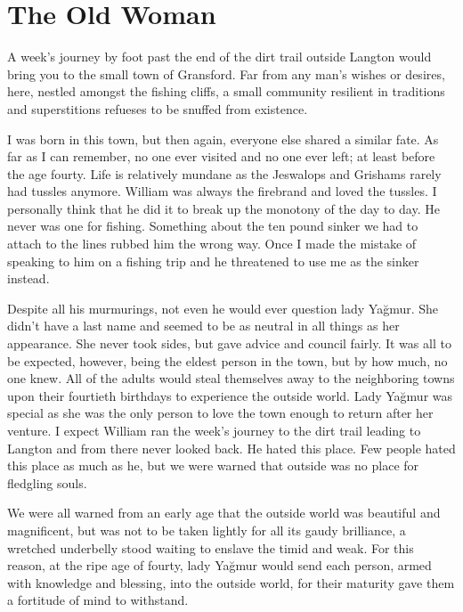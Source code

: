 \chapter*{The Old Woman}


A week's journey by foot past the end of the dirt trail outside Langton would bring you to the small town of Gransford. Far from any man's wishes or desires, here, nestled amongst the fishing cliffs, a small community resilient in traditions and superstitions refueses to be snuffed from existence.

I was born in this town, but then again, everyone else shared a similar fate. As far as I can remember, no one ever visited and no one ever left; at least before the age fourty. Life is relatively mundane as the Jeswalops and Grishams rarely had tussles anymore. William was always the firebrand and loved the tussles. I personally think that he did it to break up the monotony of the day to day. He never was one for fishing. Something about the ten pound sinker we had to attach to the lines rubbed him the wrong way. Once I made the mistake of speaking to him on a fishing trip and he threatened to use me as the sinker instead.

Despite all his murmurings, not even he would ever question lady Yağmur. She didn't have a last name and seemed to be as neutral in all things as her appearance. She never took sides, but gave advice and council fairly. It was all to be expected, however, being the eldest person in the town, but by how much, no one knew. All of the adults would steal themselves away to the neighboring towns upon their fourtieth birthdays to experience the outside world. Lady Yağmur was special as she was the only person to love the town enough to return after her venture. I expect William ran the week's journey to the dirt trail leading to Langton and from there never looked back. He hated this place. Few people hated this place as much as he, but we were warned that outside was no place for fledgling souls.

We were all warned from an early age that the outside world was beautiful and magnificent, but was not to be taken lightly for all its gaudy brilliance, a wretched underbelly stood waiting to enslave the timid and weak. For this reason, at the ripe age of fourty, lady Yağmur would send each person, armed with knowledge and blessing, into the outside world, for their maturity gave them a fortitude of mind to withstand.

